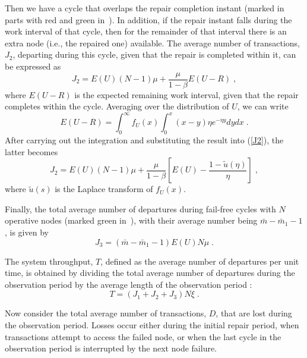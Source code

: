 Then we have a cycle that overlaps the repair completion instant (marked in parts with red and green in~). 
In addition, if the repair
instant falls during the work interval of that cycle, then for the remainder of that interval there
is an extra node (i.e., the repaired one) available.
The average number of transactions, $J_2$, departing during
this  cycle, given that the repair is completed within it, can %
be
expressed as
\begin{equation}  \label{J2}
    J_2 = E(U)(N-1)\mu + \frac{\mu}{1-\beta} E(U-R) \;,
\end{equation}
where $E(U-R)$ is the expected remaining work interval, given that the repair
completes within the cycle. Averaging over the distribution of $U$, we can write
\begin{equation}  \label{UR}
E(U-R) = \int_0^\infty f_U(x)\int_0^x (x-y) \eta e^{-\eta y}dydx \;.
\end{equation}
After carrying out the integration and substituting the result into (\ref{J2}), the
latter becomes
\begin{equation}  \label{J22}
J_2 = E(U)(N-1)\mu + \frac{\mu}{1-\beta} \left [ E(U) -
\frac{1- \tilde{u}(\eta)}{\eta} \right ] \;,
\end{equation}
where $\tilde{u}(s)$ is the Laplace transform of $f_U(x)$.

Finally, the total average number of departures during fail-free 
cycles with $N$ operative nodes (marked green in~),
with their average number being $\bar{m} - \bar{m}_1 -1$, is given
by 
\begin{equation}
J_3 = (\bar{m} - \bar{m}_1 -1) E(U) N\mu\;.
\end{equation}

The system throughput, $T$, defined as the average number of departures per
unit time, is obtained by dividing the total average number of departures during
the observation period by the average length of the observation period :
\begin{equation}
T = (J_1 +J_2 +J_3)N\xi\;.
\end{equation}

Now consider the total average number of transactions, $D$, that are lost during the
observation period. Losses occur either during the initial repair period, when
transactions attempt to access the failed node, or when the last cycle in
the observation period is interrupted by the next node failure.

